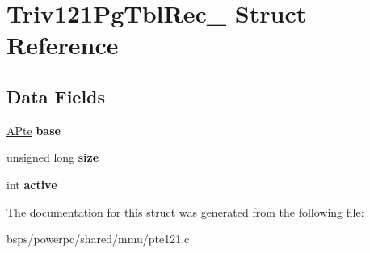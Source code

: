 \hypertarget{structTriv121PgTblRec__}{}\section{Triv121\+Pg\+Tbl\+Rec\+\_\+ Struct Reference}
\label{structTriv121PgTblRec__}
\subsection*{Data Fields}
\begin{DoxyCompactItemize}
\item 
\mbox{\label{structTriv121PgTblRec___afb87aca4440d10326d6aa156bd98b9a9}} 
\mbox{\hyperlink{structPTERec__}{A\+Pte}} {\bfseries base}
\item 
\mbox{\label{structTriv121PgTblRec___ab57477b56708869607f8bee300a47683}} 
unsigned long {\bfseries size}
\item 
\mbox{\label{structTriv121PgTblRec___aad8863939f93de837f6df5cc3876a73b}} 
int {\bfseries active}
\end{DoxyCompactItemize}


The documentation for this struct was generated from the following file\+:\begin{DoxyCompactItemize}
\item 
bsps/powerpc/shared/mmu/pte121.\+c\end{DoxyCompactItemize}
